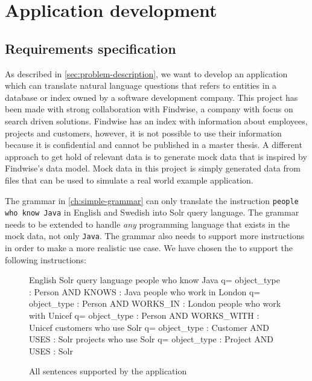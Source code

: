 \chapter{Application development}\label{ch:application-overview}

\section{Requirements specification}

As described in \autoref{sec:problem-description}, we want to develop an application which can translate natural language questions that refers to entities in a database or index owned by a software development company. This project has been made with strong collaboration with Findwise, a company with focus on search driven solutions. Findwise has an index with information about employees, projects and customers, however, it is not possible to use their information because it is confidential and cannot be published in a master thesis. A different approach to get hold of relevant data is to generate mock data that is inspired by Findwise's data model. Mock data in this project is simply generated data from files that can be used to simulate a real world example application.

\label{sec:grammar-development}
The grammar in \autoref{ch:simple-grammar} can only translate the instruction \texttt{people who know Java} in English and Swedish into Solr query language. The grammar needs to be extended to handle \emph{any} programming language that exists in the mock data, not only \texttt{Java}. The grammar also needs to support more instructions in order to make a more realistic use case. We have chosen the to support the following instructions:

\begin{figure}[H]
\begin{terminal}
English                        Solr query language
people who know Java           q= object_type : Person AND KNOWS : Java
people who work in London      q= object_type : Person AND WORKS_IN : London
people who work with Unicef    q= object_type : Person AND WORKS_WITH : Unicef
customers who use Solr         q= object_type : Customer AND USES : Solr
projects who use Solr          q= object_type : Project AND USES : Solr
\end{terminal}
\caption{All sentences supported by the application}\label{fig:suppported-sentences}
\end{figure}

